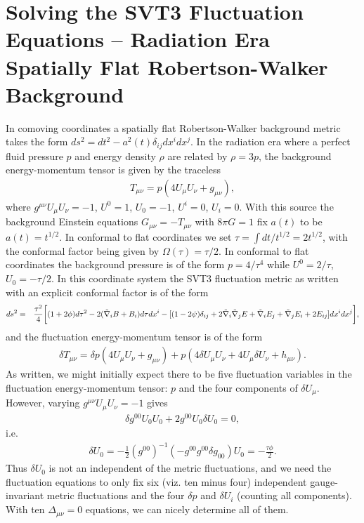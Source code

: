 \documentclass[aps,onecolumn,10pt]{revtex4}
\numberwithin{equation}{section}
\numberwithin{equation}{section}
\begin{document}
\section{Solving the SVT3 Fluctuation Equations -- Radiation Era Spatially Flat Robertson-Walker Background}
\label{S8}
In comoving coordinates a spatially flat Robertson-Walker background metric takes the form $ds^2=dt^2-a^2(t)\delta_{ij}dx^idx^j$. In the radiation era where a perfect fluid pressure $p$ and energy density $\rho$ are related by $\rho=3p$, the background energy-momentum tensor is given by the traceless
%
\begin{eqnarray}
T_{\mu\nu}=p(4U_{\mu}U_{\nu}+g_{\mu\nu}),
\label{8.1}
\end{eqnarray}
%
where $g^{\mu\nu}U_{\mu}U_{\nu}=-1$, $U^{0}=1$, $U_0=-1$, $U^{i}=0$, $U_i=0$. With this source the background Einstein equations $G_{\mu\nu}=-T_{\mu\nu}$ with $8\pi G=1$ fix $a(t)$ to be $a(t)=t^{1/2}$. In conformal to flat coordinates we set $\tau=\int dt/t^{1/2}=2t^{1/2}$, with the conformal factor being given by $\Omega(\tau)=\tau/2$. In conformal to flat coordinates the background pressure is of the form $p=4/\tau^4$ while $U^{0}=2/\tau$, $U_0=-\tau/2$. In this coordinate system the SVT3 fluctuation metric as written with an explicit conformal factor is of the form 
%
\begin{eqnarray}
ds^2 &=&\frac{\tau^2}{4}\bigg{[}(1+2\phi) d\tau^2 -2(\tilde{\nabla}_i B +B_i)d\tau dx^i - [(1-2\psi)\delta_{ij} +2\tilde{\nabla}_i\tilde{\nabla}_j E + \tilde{\nabla}_i E_j + \tilde{\nabla}_j E_i + 2E_{ij}]dx^i dx^j\bigg{]},
\label{8.2}
\end{eqnarray}
%
and the fluctuation energy-momentum tensor is of the form
%
\begin{eqnarray}
\delta T_{\mu\nu}=\delta p(4U_{\mu}U_{\nu}+g_{\mu\nu})+p(4\delta U_{\mu}U_{\nu}+4U_{\mu}\delta U_{\nu}+h_{\mu\nu}).
\label{8.3}
\end{eqnarray}
%
As written, we might initially expect there to be five fluctuation variables in the fluctuation energy-momentum tensor: $p$ and the four components of $\delta U_{\mu}$. However, varying  $g^{\mu\nu}U_{\mu}U_{\nu}=-1$ gives 
%
\begin{eqnarray}
 \delta g^{00}U_{0}U_{0}+2g^{00}U_{0}\delta U_{0}=0,
\label{8.4}
\end{eqnarray}
%
i.e. 
%
\begin{eqnarray}
\delta U_{0}=-\frac{1}{2}(g^{00})^{-1}(-g^{00}g^{00}\delta g_{00})U_{0}=-\frac{\tau\phi}{2}.
\label{8.5}
\end{eqnarray}
%
Thus $\delta U_{0}$ is not an independent of the metric fluctuations, and we need the fluctuation equations to only fix six (viz. ten minus four) independent gauge-invariant metric fluctuations and the  four $\delta p$ and $\delta U_i$ (counting all components). With ten $\Delta_{\mu\nu}=0$ equations, we can nicely determine all of them. 
\end{document}
